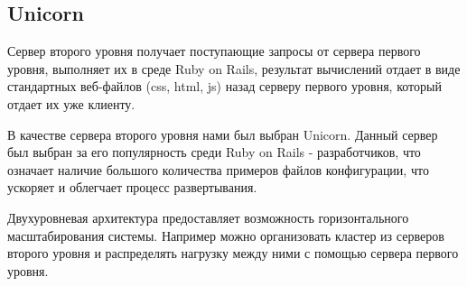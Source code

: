 \subsection{Unicorn}
Сервер второго уровня получает поступающие запросы от сервера первого уровня,
выполняет их в среде Ruby on Rails, результат вычислений отдает в виде
стандартных веб-файлов (css, html, js) назад серверу первого уровня, который
отдает  их уже клиенту.

В качестве сервера второго уровня нами был выбран Unicorn. Данный сервер был
выбран за его популярность среди Ruby on Rails - разработчиков, что означает
наличие большого количества примеров файлов конфигурации, что ускоряет и
облегчает процесс развертывания.

Двухуровневая архитектура предоставляет возможность горизонтального
масштабирования системы. Например можно организовать кластер из серверов второго
уровня и распределять нагрузку между ними с помощью сервера первого уровня.
